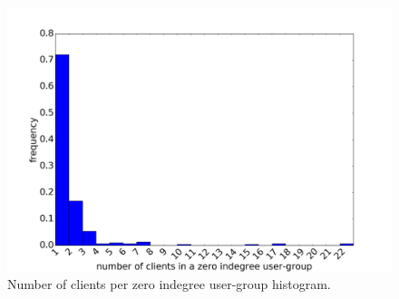 \begin{figure}[H]
    \centering
    \includegraphics[width=0.7\linewidth]{./figures/results/final_remarks/cnt_clients_zero_indegree_vertex_distribution.png}
    \caption{Number of clients per zero indegree user-group histogram.}
\label{fig:number_of_clients_per_zero_indegree_vertex}
\end{figure}%
